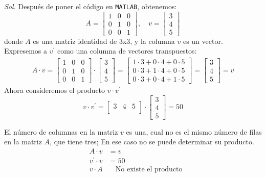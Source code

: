 \textit{ Sol. }
Después de poner el código en \texttt{MATLAB}, obtenemos:
\begin{equation}
	A= \begin{bmatrix}
		1 & 0 & 0 \\0&1&0\\0&0&1
	\end{bmatrix}, \quad v=\begin{bmatrix}
		3 \\4\\5
	\end{bmatrix}
\end{equation}
donde $A$ es una matriz identidad de 3x3, y la columna $v$ es un vector. Expresemos a $v^{\prime}$ como una columna de vectores transpuestos:
\begin{align*}
	A\cdot v= \begin{bmatrix}
		             1 & 0 & 0 \\0&1&0\\0&0&1
	             \end{bmatrix}\cdot \begin{bmatrix}
		                                3 \\4\\5
	                                \end{bmatrix}=\begin{bmatrix}
		            1\cdot 3+0\cdot4+0\cdot5   \\
		            0\cdot 3+1\cdot 4+0\cdot 5 \\
		            0\cdot 3+0\cdot 4+1\cdot 5
	            \end{bmatrix}=\begin{bmatrix}
		            3 \\4\\5
	            \end{bmatrix}=v
\end{align*}
Ahora consideremos el producto $v\cdot v^{\prime}$
\begin{equation*}
	v\cdot v^{\prime}= \begin{bmatrix}
		3 & 4 & 5 \\
	\end{bmatrix}\cdot \begin{bmatrix}
		3 \\4\\5
	\end{bmatrix}=50
\end{equation*}

El número de columnas en la matriz $v$ es una, cual no es el mismo número de filas en la matriz $A$, que tiene tres; En ese caso no se puede determinar su producto.
\begin{align}
	 & A\cdot v          & =v                                 \\
	 & v^{\prime}\cdot v & =50                                \\
	 & v\cdot A          & \quad \text{No existe el producto}
\end{align}

